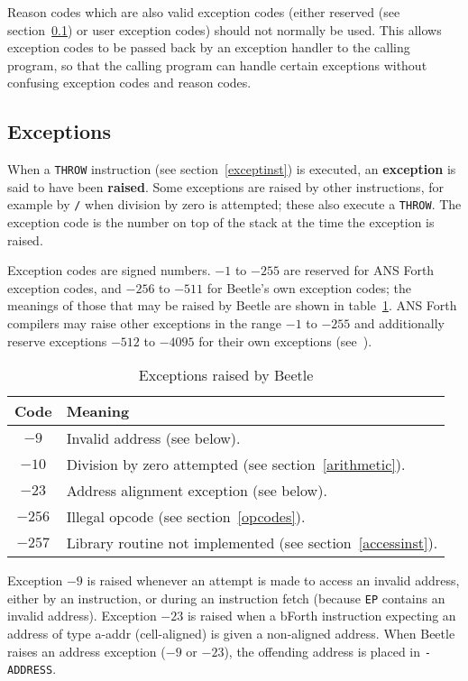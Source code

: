 \documentclass[english]{article}
\newcommand{\spic}[1]{{\spfont\setlength{\baselineskip}{\normalbaselineskip}#1\/}}
\newlength{\opcode}\opcode=0.5in
\begin{document}
Reason codes which are also valid exception codes (either reserved (see section~\ref{exceptions})
or user exception codes) should not normally be used. This
allows exception codes to be passed back by an exception handler to the calling
program, so that the calling program can handle certain exceptions without
confusing exception codes and reason codes.


\subsection{Exceptions}
\label{exceptions}

When a {\tt THROW} instruction (see section~\ref{exceptinst}) is executed, an
{\bf exception} is said to have been {\bf raised}. Some exceptions are raised by
other instructions, for example by {\tt /} when division by zero is attempted;
these also execute a {\tt THROW}. The exception code is the number on top of the
stack at the time the exception is raised.

Exception codes are signed numbers. $-1$ to $-255$ are reserved for ANS Forth
exception codes, and $-256$ to $-511$ for Beetle's own exception codes; the meanings
of those that may be raised by Beetle are shown in table~\ref{excepttable}. ANS
Forth compilers may raise other exceptions in the range $-1$ to $-255$ and
additionally reserve exceptions $-512$ to $-4095$ for their own exceptions
(see~\cite[section 9.3.1]{ANSIforth}).

\begin{table}[htbp]
\begin{center}
\begin{tabular}{cl} \toprule
\bf Code & \bf Meaning \\ \midrule
$-9$ & Invalid address (see below). \\
$-10$ & Division by zero attempted (see section~\ref{arithmetic}). \\
$-23$ & Address alignment exception (see below). \\
$-256$ & Illegal opcode (see section~\ref{opcodes}). \\
$-257$ & Library routine not implemented (see section~\ref{accessinst}). \\ \bottomrule
\end{tabular}
\caption{\label{excepttable}Exceptions raised by Beetle}
\end{center}
\end{table}

Exception $-9$ is raised whenever an attempt is made to access an invalid
address, either by an
instruction, or during an instruction fetch (because {\tt EP} contains an
invalid address). Exception $-23$ is raised when a bForth instruction expecting
an address of type \spic{a-addr} (cell-aligned) is given a non-aligned address.
When Beetle raises an address exception ($-9$ or $-23$), the offending address
is placed in {\tt -ADDRESS}.
\end{document}
